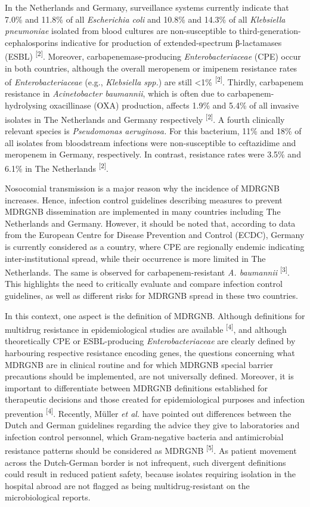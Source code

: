 \documentclass[
]{book}
\begin{document}
In the Netherlands and Germany, surveillance systems currently indicate that 7.0\% and 11.8\% of all \emph{Escherichia coli} and 10.8\% and 14.3\% of all \emph{Klebsiella pneumoniae} isolated from blood cultures are non-susceptible to third-generation-cephalosporins indicative for production of extended-spectrum β-lactamases (ESBL) \textsuperscript{{[}2{]}}. Moreover, carbapenemase-producing \emph{Enterobacteriaceae} (CPE) occur in both countries, although the overall meropenem or imipenem resistance rates of \emph{Enterobacteriaceae} (e.g., \emph{Klebsiella spp.}) are still \textless1\% \textsuperscript{{[}2{]}}. Thirdly, carbapenem resistance in \emph{Acinetobacter baumannii}, which is often due to carbapenem-hydrolysing oxacillinase (OXA) production, affects 1.9\% and 5.4\% of all invasive isolates in The Netherlands and Germany respectively \textsuperscript{{[}2{]}}. A fourth clinically relevant species is \emph{Pseudomonas aeruginosa.} For this bacterium, 11\% and 18\% of all isolates from bloodstream infections were non-susceptible to ceftazidime and meropenem in Germany, respectively. In contrast, resistance rates were 3.5\% and 6.1\% in The Netherlands \textsuperscript{{[}2{]}}.

Nosocomial transmission is a major reason why the incidence of MDRGNB increases. Hence, infection control guidelines describing measures to prevent MDRGNB dissemination are implemented in many countries including The Netherlands and Germany. However, it should be noted that, according to data from the European Centre for Disease Prevention and Control (ECDC), Germany is currently considered as a country, where CPE are regionally endemic indicating inter-institutional spread, while their occurrence is more limited in The Netherlands. The same is observed for carbapenem-resistant \emph{A. baumannii} \textsuperscript{{[}3{]}}. This highlights the need to critically evaluate and compare infection control guidelines, as well as different risks for MDRGNB spread in these two countries.

In this context, one aspect is the definition of MDRGNB. Although definitions for multidrug resistance in epidemiological studies are available \textsuperscript{{[}4{]}}, and although theoretically CPE or ESBL-producing \emph{Enterobacteriaceae} are clearly defined by harbouring respective resistance encoding genes, the questions concerning what MDRGNB are in clinical routine and for which MDRGNB special barrier precautions should be implemented, are not universally defined. Moreover, it is important to differentiate between MDRGNB definitions established for therapeutic decisions and those created for epidemiological purposes and infection prevention \textsuperscript{{[}4{]}}. Recently, Müller \emph{et al.} have pointed out differences between the Dutch and German guidelines regarding the advice they give to laboratories and infection control personnel, which Gram-negative bacteria and antimicrobial resistance patterns should be considered as MDRGNB \textsuperscript{{[}5{]}}. As patient movement across the Dutch-German border is not infrequent, such divergent definitions could result in reduced patient safety, because isolates requiring isolation in the hospital abroad are not flagged as being multidrug-resistant on the microbiological reports.
\end{document}
